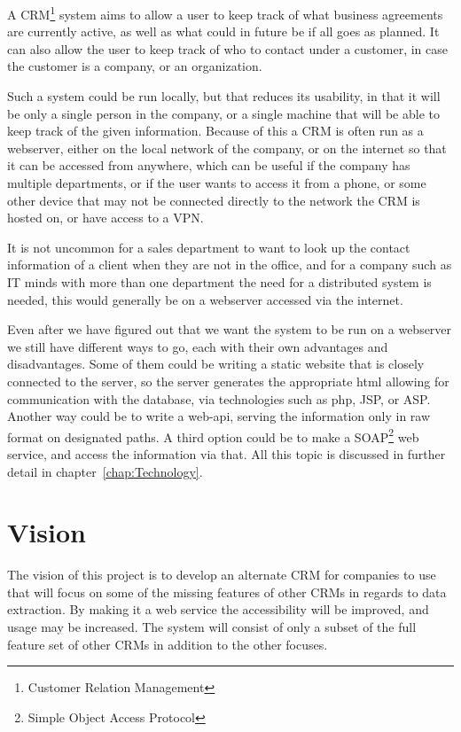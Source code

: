 A CRM\footnote{Customer Relation Management} system aims to allow a user to keep track of what business agreements are currently active, as well as what could in future be if all goes as planned. It can also allow the user to keep track of who to contact under a customer, in case the customer is a company, or an organization.

Such a system could be run locally, but that reduces its usability, in that it will be only a single person in the company, or a single machine that will be able to keep track of the given information. Because of this a CRM is often run as a webserver, either on the local network of the company, or on the internet so that it can be accessed from anywhere, which can be useful if the company has multiple departments, or if the user wants to access it from a phone, or some other device that may not be connected directly to the network the CRM is hosted on, or have access to a VPN.

It is not uncommon for a sales department to want to look up the contact information of a client when they are not in the office, and for a company such as IT minds with more than one department the need for a distributed system is needed, this would generally be on a webserver accessed via the internet.

Even after we have figured out that we want the system to be run on a webserver we still have different ways to go, each with their own advantages and disadvantages. Some of them could be writing a static website that is closely connected to the server, so the server generates the appropriate html allowing for communication with the database, via technologies such as php, JSP, or ASP. Another way could be to write a web-api, serving the information only in raw format on designated paths. A third option could be to make a SOAP\footnote{Simple Object Access Protocol} web service, and access the information via that. All this topic is discussed in further detail in chapter~\ref{chap:Technology}.

\section{Vision}
\label{sec:Vision}
The vision of this project is to develop an alternate CRM for companies to use that will focus on some of the missing features of other CRMs in regards to data extraction. By making it a web service the accessibility will be improved, and usage may be increased. The system will consist of only a subset of the full feature set of other CRMs in addition to the other focuses.

